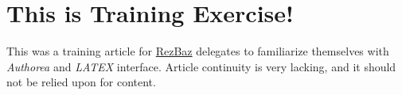 \section{This is Training Exercise!}
This was a training article for \href{http://melbourne.resbaz.edu.au/}{RezBaz} delegates to familiarize themselves with \textit{Authorea} and \textit{LATEX} interface. 
Article continuity is very lacking, and it should not be relied upon for content. 